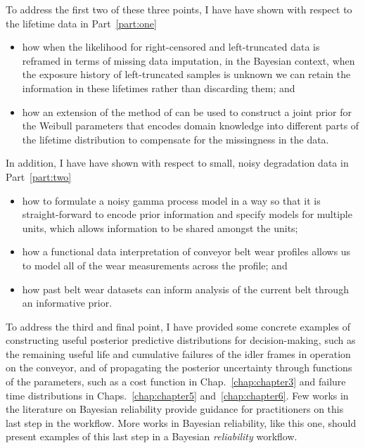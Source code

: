 To address the first two of these three points, I have have shown with respect to the lifetime data in Part~\ref{part:one} 
\begin{itemize}
  \item how when the likelihood for right-censored and left-truncated data is reframed in terms of missing data imputation, in the Bayesian context, when the exposure history of left-truncated samples is unknown we can retain the information in these lifetimes rather than discarding them; and
  \item how an extension of the method of \citet{kaminskiy2005} can be used to construct a joint prior for the Weibull parameters that encodes domain knowledge into different parts of the lifetime distribution to compensate for the missingness in the data.
\end{itemize}
In addition, I have have shown with respect to small, noisy degradation data in Part~\ref{part:two}
\begin{itemize}
  \item how to formulate a noisy gamma process model in a way so that it is straight-forward to encode prior information and specify models for multiple units, which allows information to be shared amongst the units;
  \item how a functional data interpretation of conveyor belt wear profiles allows us to model all of the wear measurements across the profile; and
  \item how past belt wear datasets can inform analysis of the current belt through an informative prior.
\end{itemize}
To address the third and final point, I have provided some concrete examples of constructing useful posterior predictive distributions for decision-making, such as the remaining useful life and cumulative failures of the idler frames in operation on the conveyor, and of propagating the posterior uncertainty through functions of the parameters, such as a cost function in Chap.~\ref{chap:chapter3} and failure time distributions in Chaps.~\ref{chap:chapter5} and~\ref{chap:chapter6}. Few works in the literature on Bayesian reliability provide guidance for practitioners on this last step in the workflow. More works in Bayesian reliability, like this one, should present examples of this last step in a Bayesian \emph{reliability} workflow.
